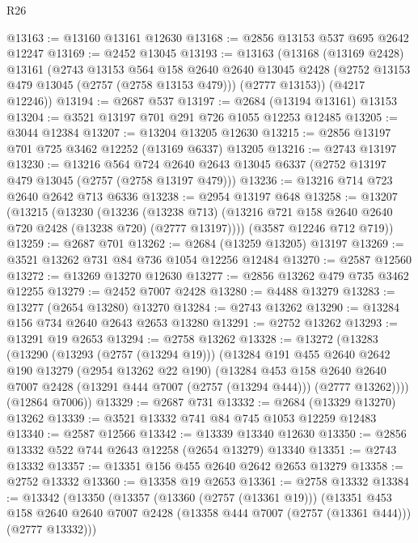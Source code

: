 \begin{lexlean}{R26}
\begin{coremodule}
@13163 := @13160 @13161 @12630
@13168 := @2856 @13153 @537 @695 @2642 @12247
@13169 := @2452 @13045
@13193 := @13163
    (@13168
      (@13169 @2428)
      @13161
      (@2743
        @13153
        @564
        @158
        @2640
        @2640
        @13045
        @2428
        (@2752 @13153 @479 @13045 (@2757 (@2758 @13153 @479)))
        (@2777 @13153))
      (@4217 @12246))
@13194 := @2687 @537
@13197 := @2684 (@13194 @13161) @13153
@13204 := @3521 @13197 @701 @291 @726 @1055 @12253 @12485
@13205 := @3044 @12384
@13207 := @13204 @13205 @12630
@13215 := @2856 @13197 @701 @725 @3462 @12252 (@13169 @6337) @13205
@13216 := @2743 @13197
@13230 := @13216
    @564
    @724
    @2640
    @2643
    @13045
    @6337
    (@2752 @13197 @479 @13045 (@2757 (@2758 @13197 @479)))
@13236 := @13216 @714 @723 @2640 @2642 @713 @6336
@13238 := @2954 @13197 @648
@13258 := @13207
    (@13215
      (@13230
        (@13236
          (@13238 @713)
          (@13216 @721 @158 @2640 @2640 @720 @2428 (@13238 @720) (@2777 @13197))))
      (@3587 @12246 @712 @719))
@13259 := @2687 @701
@13262 := @2684 (@13259 @13205) @13197
@13269 := @3521 @13262 @731 @84 @736 @1054 @12256 @12484
@13270 := @2587 @12560
@13272 := @13269 @13270 @12630
@13277 := @2856 @13262 @479 @735 @3462 @12255
@13279 := @2452 @7007 @2428
@13280 := @4488 @13279
@13283 := @13277 (@2654 @13280) @13270
@13284 := @2743 @13262
@13290 := @13284 @156 @734 @2640 @2643 @2653 @13280
@13291 := @2752 @13262
@13293 := @13291 @19 @2653
@13294 := @2758 @13262
@13328 := @13272
    (@13283
      (@13290
        (@13293 (@2757 (@13294 @19)))
        (@13284
          @191
          @455
          @2640
          @2642
          @190
          @13279
          (@2954 @13262 @22 @190)
          (@13284
            @453
            @158
            @2640
            @2640
            @7007
            @2428
            (@13291 @444 @7007 (@2757 (@13294 @444)))
            (@2777 @13262))))
      (@12864 @7006))
@13329 := @2687 @731
@13332 := @2684 (@13329 @13270) @13262
@13339 := @3521 @13332 @741 @84 @745 @1053 @12259 @12483
@13340 := @2587 @12566
@13342 := @13339 @13340 @12630
@13350 := @2856 @13332 @522 @744 @2643 @12258 (@2654 @13279) @13340
@13351 := @2743 @13332
@13357 := @13351 @156 @455 @2640 @2642 @2653 @13279
@13358 := @2752 @13332
@13360 := @13358 @19 @2653
@13361 := @2758 @13332
@13384 := @13342
    (@13350
      (@13357
        (@13360 (@2757 (@13361 @19)))
        (@13351
          @453
          @158
          @2640
          @2640
          @7007
          @2428
          (@13358 @444 @7007 (@2757 (@13361 @444)))
          (@2777 @13332)))

\end{coremodule}
\end{lexlean}
